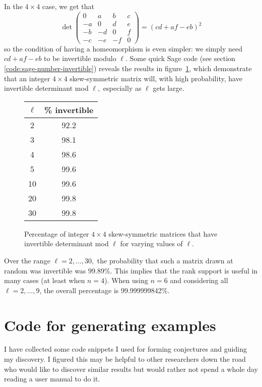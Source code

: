 \documentclass [11pt, proquest] {uwthesis}[2020/02/24]
\begin{document}
{    In the $4\times 4$ case, we get that
    \[\det\begin{pmatrix}
        0 & a & b & c\\
        -a & 0 & d & e\\
        -b & -d & 0 & f\\
        -c & -e & -f & 0
    \end{pmatrix}=(cd+af-eb)^2\]
    so the condition of having a homeomorphism is even simpler: we simply need $cd+af-eb$ to be invertible modulo $\ell.$ Some quick Sage code (see section \ref{code:sage-number-invertible}) reveals the results in figure~\ref{fig:invertible-table}, which demonstrate that an integer $4\times 4$ skew-symmetric matrix will, with high probability, have invertible determinant mod $\ell,$ especially as $\ell$ gets large. 
    \begin{figure}
        \centering
        \begin{tabular}{c|c}
            $\ell$ & \% invertible \\\hline
            2 & 92.2\\
            3 & 98.1\\
            4 & 98.6\\
            5 & 99.6\\
            10 & 99.6\\
            20 & 99.8\\
            30 & 99.8
        \end{tabular}
        \caption{Percentage of integer $4\times 4$ skew-symmetric matrices that have invertible determinant mod $\ell$ for varying values of $\ell$.}
        \label{fig:invertible-table}
    \end{figure}
    Over the range $\ell=2,\dots,30,$ the probability that such a matrix drawn at random was invertible was 99.89\%. This implies that the rank support is useful in many cases (at least when $n=4$). When using $n=6$ and considering all $\ell=2,...,9$, the overall percentage is 99.999999842\%.
}
\printendnotes

%
%
\nocite{*}   %


%
%
\appendix
\raggedbottom\sloppy
 
 
\chapter{Code for generating examples}
I have collected some code snippets I used for forming conjectures and guiding my discovery. I figured this may be helpful to other researchers down the road who would like to discover similar results but would rather not spend a whole day reading a user manual to do it.
\end{document}
